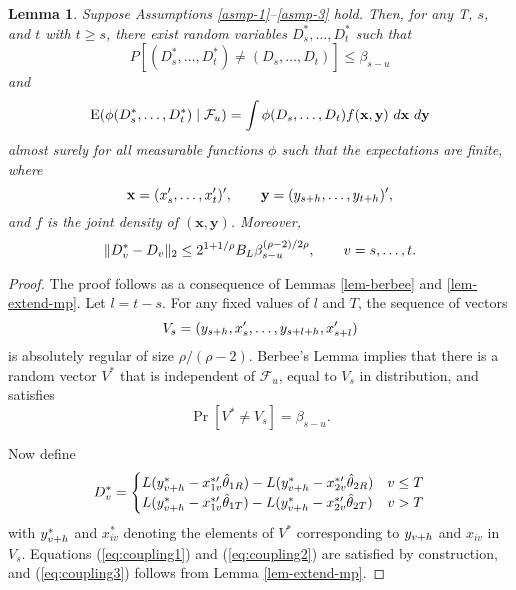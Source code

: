 \documentclass[11pt]{article}
\newtheorem{lem}{Lemma}
\begin{document}
\begin{lem}\label{lem-basic-coupling}
  Suppose Assumptions \ref{asmp-1}--\ref{asmp-3} hold.  Then, for any
  T, $s$, and $t$ with $t \geq s$, there exist random variables
  $D_s^*,\dots,D_t^*$ such that
  \begin{equation}\label{eq:coupling1}
    P[(D_s^*,\dots,D_t^*) \neq (D_s,\dots,D_t)] \leq \beta_{s-u}
  \end{equation}
  and
  \begin{equation}\label{eq:coupling2}
    \E(\phi(D_s^*,\dots, D_t^*) \mid \mathcal{F}_u ) =
    \int
    \phi(D_s,\dots,D_t) f(\mathbf{x}, \mathbf{y})\ d\mathbf{x}\ d\mathbf{y}
  \end{equation}
  almost surely for all measurable functions $\phi$ such that the
  expectations are finite, where
  \[ \mathbf{x} = (x_{s}', \dots, x_{t}')', \qquad
  \mathbf{y} = (y_{s+h},\dots,y_{t+h})',\] and $f$ is the
  joint density of $(\mathbf{x}, \mathbf{y})$.  Moreover,
 \begin{equation}\label{eq:coupling3}
   \| D_v^* - D_v \|_2 \leq 2^{1+1/\rho} B_L
   \beta_{s-u}^{(\rho-2)/2\rho}, \qquad v = s,\dots,t.
 \end{equation}
\end{lem}

\begin{proof}
  The proof follows as a consequence of Lemmas \ref{lem-berbee} and
  \ref{lem-extend-mp}.  Let $l = t-s$.  For any fixed values of $l$
  and $T$, the sequence of vectors
  \[ V_s = (y_{s+h}, x_{s}', \dots, y_{s+l+h}, x_{s+l}') \] is
  absolutely regular of size $\rho/(\rho-2)$.  Berbee's Lemma implies
  that there is a random vector $V^*$ that is independent of
  $\mathcal{F}_u$, equal to $V_s$ in distribution, and satisfies
  \[\Pr[V^* \neq V_s] = \beta_{s-u}.\]

  Now define
  \begin{equation*}
    D_v^* =
    \begin{cases}
      L(y_{v+h}^* - x_{1v}^{*\prime} \hat{\theta}_{1R}) - L(y_{v+h}^* -
      x_{2v}^{*\prime} \hat{\theta}_{2R}) & v \leq T \\
      L(y_{v+h}^* - x_{1v}^{*\prime} \hat{\theta}_{1T}) - L(y_{v+h}^* -
      x_{2v}^{*\prime} \hat{\theta}_{2T}) & v > T
    \end{cases}
  \end{equation*}
  with $y_{v+h}^*$ and $x_{iv}^*$ denoting the elements of $V^*$
  corresponding to $y_{v+h}$ and $x_{iv}$ in $V_s$.  Equations
  (\ref{eq:coupling1}) and (\ref{eq:coupling2}) are satisfied by
  construction, and (\ref{eq:coupling3}) follows from Lemma
  \ref{lem-extend-mp}.
\end{proof}
\end{document}
